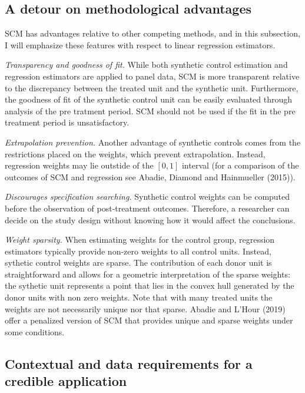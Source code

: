 \documentclass[12pt,a4paper,draft]{article}
\begin{document}
\subsection{A detour on methodological advantages}

SCM has advantages relative to other competing methods, and in this subsection, 
I will emphasize these features with respect to linear regression estimators.

\emph{Transparency and goodness of fit.} While both 
synthetic control estimation and regression estimators are applied to panel data, 
SCM is more transparent relative to the discrepancy between the treated unit and the 
synthetic unit. Furthermore, the goodness of fit of the synthetic control unit 
can be easily evaluated through analysis of the pre tratment period. SCM should 
not be used if the fit in the pre treatment period is unsatisfactory.

\emph{Extrapolation prevention.} Another advantage of synthetic controls comes from the 
restrictions placed on the weights, which prevent extrapolation. Instead, 
regression weights may lie outstide of the $[0,1]$ interval (for a comparison 
of the outcomes of SCM and regression see Abadie, Diamond and Hainmueller (2015)). 

\emph{Discourages specification searching.} Synthetic control weights can be computed 
before the observation of post-treatment outcomes.
Therefore, a researcher can decide on the study design without knowing how it would 
affect the conclusions.

\emph{Weight sparsity.} When estimating weights for 
the control group, regression estimators typically provide non-zero weights to all control 
units. Instead, sythetic control weights are sparse. The contribution of each 
donor unit is straightforward and allows for a geometric interpretation of the 
sparse weights: the sythetic unit represents a point that lies in the convex hull 
generated by the donor units with non zero weights.
Note that with many treated units the weights are not necessarily unique nor 
that sparse. Abadie and L'Hour (2019) offer a penalized version of SCM that 
provides unique and sparse weights under some conditions.



\subsection{Contextual and data requirements for a credible application}
\end{document}
